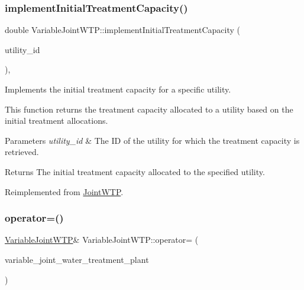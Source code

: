 \subsubsection{\texorpdfstring{implement\+Initial\+Treatment\+Capacity()}{implementInitialTreatmentCapacity()}}
{\footnotesize\ttfamily double Variable\+Joint\+W\+T\+P\+::implement\+Initial\+Treatment\+Capacity (\begin{DoxyParamCaption}\item[{int}]{utility\+\_\+id }\end{DoxyParamCaption})\hspace{0.3cm}{\ttfamily [override]}, {\ttfamily [virtual]}}



Implements the initial treatment capacity for a specific utility. 

This function returns the treatment capacity allocated to a utility based on the initial treatment allocations.


\begin{DoxyParams}{Parameters}
{\em utility\+\_\+id} & The ID of the utility for which the treatment capacity is retrieved.\\
\hline
\end{DoxyParams}
\begin{DoxyReturn}{Returns}
The initial treatment capacity allocated to the specified utility. 
\end{DoxyReturn}


Reimplemented from \mbox{\hyperlink{classJointWTP_ae8a2a5c4d5173b43d30fc9c1169574f8}{Joint\+W\+TP}}.

\mbox{\label{classVariableJointWTP_acb9e62cc3198df8df6c7ac87c7f7a4cd}} 
\subsubsection{\texorpdfstring{operator=()}{operator=()}}
{\footnotesize\ttfamily \mbox{\hyperlink{classVariableJointWTP}{Variable\+Joint\+W\+TP}}\& Variable\+Joint\+W\+T\+P\+::operator= (\begin{DoxyParamCaption}\item[{const \mbox{\hyperlink{classVariableJointWTP}{Variable\+Joint\+W\+TP}} \&}]{variable\+\_\+joint\+\_\+water\+\_\+treatment\+\_\+plant }\end{DoxyParamCaption})}



